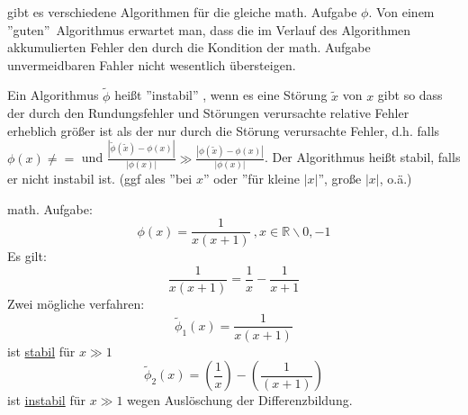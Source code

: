 \documentclass[../Skript.tex]{subfiles}
\begin{document}
\begin{remark} \typicherweise gibt es verschiedene Algorithmen für die gleiche math. Aufgabe $\phi$. Von einem ''guten''\ Algorithmus erwartet man, dass die im Verlauf des Algorithmen akkumulierten Fehler den durch die Kondition der math. Aufgabe unvermeidbaren Fahler nicht wesentlich übersteigen.
\end{remark}
\begin{definition}
     Ein Algorithmus $\tilde{\phi}$ heißt ''instabil'' , wenn es eine Störung $\tilde{x}$ von $x$ gibt so dass der durch den Rundungsfehler und Störungen verursachte relative Fehler erheblich größer ist als der nur durch die Störung verursachte Fehler, d.h. falls $\phi(x) \neq = $ und $\displaystyle\frac{|\tilde{\phi}(\tilde{x})-\phi(x)|}{|\phi(x)|}\gg \displaystyle\frac{|\phi(\tilde{x})-\phi(x)|}{|\phi(x)|} $.
    Der Algorithmus heißt stabil, falls er nicht instabil ist. (ggf ales ''bei $x$'' oder ''für kleine $|x|$'', große $|x|$, o.ä.)
\end{definition}
\begin{example}
    math. Aufgabe: $$\phi(x)=\frac{1}{x(x+1)} \ , x \in \mathbb{R}\backslash {0,-1}$$
    Es gilt: $$\frac{1}{x(x+1)}=\frac{1}{x}-\frac{1}{x+1}$$
    Zwei mögliche verfahren:$$\tilde{\phi}_1(x)=\frac{1}{x(x+1)}$$ ist \underline{stabil} für $x\gg 1$
    $$\tilde{\phi}_2 (x)= \left(\frac{1}{x}\right)-\left(\frac{1}{(x+1)}\right)$$ ist 
    \underline{instabil} für $x \gg 1$ wegen Auslöschung der Differenzbildung.
\end{example}
\end{document}
